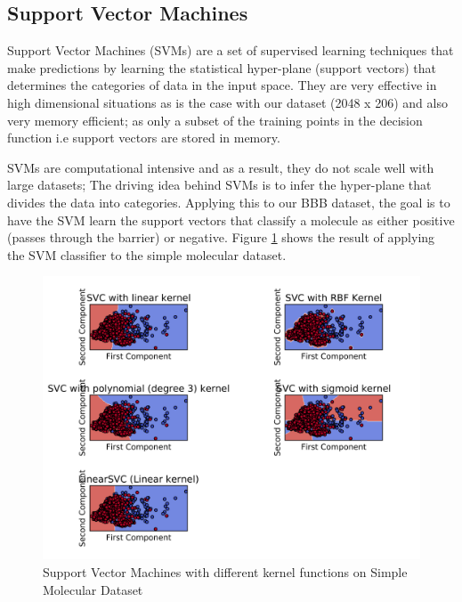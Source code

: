 \documentclass[a4paper,12pt]{report}
\begin{document}
		
		
		\subsection{Support Vector Machines}
		Support Vector Machines (SVMs) are a set of supervised learning techniques that make predictions by learning the statistical hyper-plane (support vectors) that determines the categories of data in the input space. They are very effective in high dimensional situations as is the case with our dataset (2048 x 206) and also very memory efficient; as only a subset of the training points in the decision function i.e support vectors are stored in memory. 
		
		SVMs are computational intensive and as a result, they do not scale well with large datasets; The driving idea behind SVMs is to infer the hyper-plane that divides the data into categories. Applying this to our BBB dataset, the goal is to have the SVM learn the support vectors that classify a molecule as either positive (passes through the barrier) or negative. Figure \ref{fig:svm_mol} shows the result of applying the SVM classifier to the simple molecular dataset.
		\begin{figure}[H]
			\centering
			\includegraphics[width=\textwidth,scale=1,totalheight=0.4\textheight]{images/mol_decision_svm}
			\caption{Support Vector Machines with different kernel functions on Simple Molecular Dataset}
			\label{fig:svm_mol}
		\end{figure}
		
\end{document}
